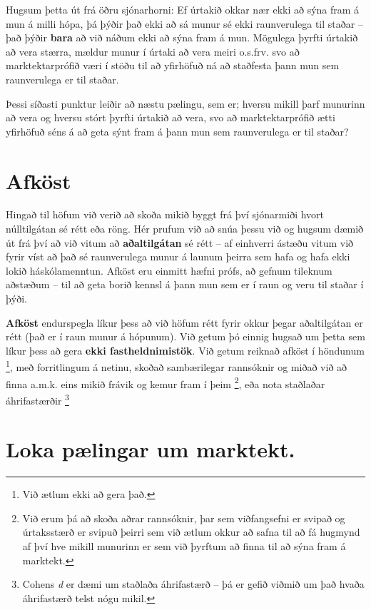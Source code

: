 \documentclass[
]{book}
\begin{document}
Hugsum þetta út frá öðru sjónarhorni: Ef úrtakið okkar nær ekki að sýna fram á mun á milli hópa, þá þýðir það ekki að sá munur sé ekki raunverulega til staðar -- það þýðir \textbf{bara} að við náðum ekki að sýna fram á mun. Mögulega þyrfti úrtakið að vera stærra, mældur munur í úrtaki að vera meiri o.s.frv. svo að marktektarprófið væri í stöðu til að yfirhöfuð ná að staðfesta þann mun sem raunverulega er til staðar.

Þessi síðasti punktur leiðir að næstu pælingu, sem er; hversu mikill þarf munurinn að vera og hversu stórt þyrfti úrtakið að vera, svo að marktektarprófið ætti yfirhöfuð séns á að geta sýnt fram á þann mun sem raunverulega er til staðar?

\hypertarget{afkuxf6st}{%
\section{Afköst}\label{afkuxf6st}}

Hingað til höfum við verið að skoða mikið byggt frá því sjónarmiði hvort núlltilgátan sé rétt eða röng. Hér prufum við að snúa þessu við og hugsum dæmið út frá því að við vitum að \textbf{aðaltilgátan} sé rétt -- af einhverri ástæðu vitum við fyrir víst að það sé raunverulega munur á launum þeirra sem hafa og hafa ekki lokið háskólamenntun. Afköst eru einmitt hæfni prófs, að gefnum tileknum aðstæðum -- til að geta borið kennsl á þann mun sem er í raun og veru til staðar í þýði.

\textbf{Afköst} endurspegla líkur þess að við höfum rétt fyrir okkur þegar aðaltilgátan er rétt (það er í raun munur á hópunum). Við getum þó einnig hugsað um þetta sem líkur þess að gera \textbf{ekki fastheldnimistök}. Við getum reiknað afköst í höndunum \footnote{Við ætlum ekki að gera það.}, með forritlingum á netinu, skoðað sambærilegar rannsóknir og miðað við að finna a.m.k. eins mikið frávik og kemur fram í þeim \footnote{Við erum þá að skoða aðrar rannsóknir, þar sem viðfangsefni er svipað og úrtaksstærð er svipuð þeirri sem við ætlum okkur að safna til að fá hugmynd af því hve mikill munurinn er sem við þyrftum að finna til að sýna fram á marktekt.}, eða nota staðlaðar áhrifastærðir \footnote{Cohens \emph{d} er dæmi um staðlaða áhrifastærð -- þá er gefið viðmið um það hvaða áhrifastærð telst nógu mikil.}

\hypertarget{loka-puxe6lingar-um-marktekt.}{%
\section{Loka pælingar um marktekt.}\label{loka-puxe6lingar-um-marktekt.}}
\end{document}
